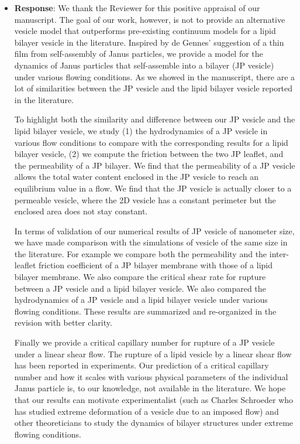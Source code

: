 \documentclass[11pt]{article}
\begin{document}
\begin{itemize}
  \item {\bf Response}: We thank the Reviewer for this positive appraisal of our manuscript.  
    The goal of our work, however, is not to provide an alternative vesicle model that outperforms
    pre-existing continuum models for a lipid bilayer vesicle in the literature.
    Inspired by de Gennes' suggestion of a thin film from self-assembly of Janus particles,
    we provide a model for the dynamics of Janus particles that self-assemble into a bilayer
    (JP vesicle) under various flowing conditions. 
    As we showed in the manuscript, there are a lot of similarities between the
    JP vesicle and the lipid bilayer vesicle reported in the literature.

To highlight both the similarity and difference between our JP vesicle and the lipid bilayer vesicle, we study (1) the hydrodynamics of a JP vesicle in various flow conditions to compare with the corresponding results for a lipid bilayer vesicle,
(2) we compute the friction between the two JP leaflet, and the permeability of a JP bilayer. We find that the permeability of a JP vesicle allows the total water content enclosed in the JP vesicle to reach an equilibrium value in a flow. We find that the JP vesicle is actually closer to a permeable vesicle, where the 2D vesicle has a constant perimeter but the enclosed area does not stay constant.

In terms of validation of our numerical results of JP vesicle of nanometer size, we have made comparison with the simulations of vesicle of the same size in the literature. For example we compare both the permeability and the inter-leaflet friction coefficient of a JP bilayer membrane with those of a lipid bilayer membrane. We also compare the critical shear rate for rupture between a JP vesicle and a lipid bilayer vesicle. We also compared the hydrodynamics of a JP vesicle and a lipid bilayer vesicle under various flowing conditions. These results are summarized
and re-organized in the revision with better clarity. 

Finally we provide a critical capillary number for rupture of a JP vesicle under a linear shear flow. The rupture of a lipid vesicle by a linear shear flow has been reported in experiments.  Our prediction of a critical capillary number and how it scales with various physical parameters of the individual Janus particle is, to our knowledge, not available in the literature. We hope that our results can motivate experimentalist (such as Charles Schroeder who has studied extreme deformation of a vesicle due to an imposed flow) and other theoreticians to study the dynamics of bilayer structures under extreme flowing conditions.
 
\end{itemize}
\end{document}
